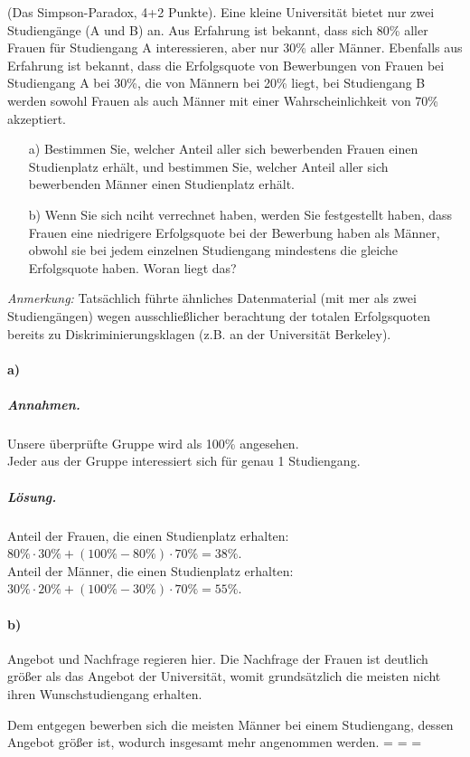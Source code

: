 \documentclass[twoside]{article}
\begin{document}
(Das Simpson-Paradox, 4+2 Punkte).
Eine kleine Universität bietet nur zwei Studiengänge (A und B) an.
Aus Erfahrung ist bekannt, dass sich 80\% aller Frauen für Studiengang A interessieren, aber nur 30\% aller Männer.
Ebenfalls aus Erfahrung ist bekannt, dass die Erfolgsquote von Bewerbungen von Frauen bei Studiengang A bei 30\%, die von Männern bei 20\% liegt, bei Studiengang B werden sowohl Frauen als auch Männer mit einer Wahrscheinlichkeit von 70\% akzeptiert.
\begin{enumerate}
	\item[a)] Bestimmen Sie, welcher Anteil aller sich bewerbenden Frauen einen Studienplatz erhält, und bestimmen Sie, welcher Anteil aller sich bewerbenden Männer einen Studienplatz erhält.
	\item[b)] Wenn Sie sich nciht verrechnet haben, werden Sie festgestellt haben, dass Frauen eine niedrigere Erfolgsquote bei der Bewerbung haben als Männer, obwohl sie bei jedem einzelnen Studiengang mindestens die gleiche Erfolgsquote haben.
	Woran liegt das?
\end{enumerate}
\textit{Anmerkung:} Tatsächlich führte ähnliches Datenmaterial (mit mer als zwei Studiengängen) wegen ausschließlicher berachtung der totalen Erfolgsquoten bereits zu Diskriminierungsklagen (z.B. an der Universität Berkeley).
\paragraph{a)}
\subparagraph{Annahmen.}
Unsere überprüfte Gruppe wird als 100\% angesehen.\\
Jeder aus der Gruppe interessiert sich für genau 1 Studiengang.
\subparagraph{Lösung.}
Anteil der Frauen, die einen Studienplatz erhalten: $80\% \cdot 30\% + (100\%-80\%) \cdot 70\% = 38\%$.\\
Anteil der Männer, die einen Studienplatz erhalten: $30\% \cdot 20\% + (100\%-30\%) \cdot 70\% = 55\%$.
\paragraph{b)}
Angebot und Nachfrage regieren hier.
Die Nachfrage der Frauen ist deutlich größer als das Angebot der Universität, womit grundsätzlich die meisten nicht ihren Wunschstudiengang erhalten.

Dem entgegen bewerben sich die meisten Männer bei einem Studiengang, dessen Angebot größer ist, wodurch insgesamt mehr angenommen werden.
\fi
\ifnum\ZettelZehn=\True
{}
\fi
\ifnum\ZettelElf=\True
{}
\fi
\ifnum\ZettelZwoelf=\True
{}
\fi
\end{document}
